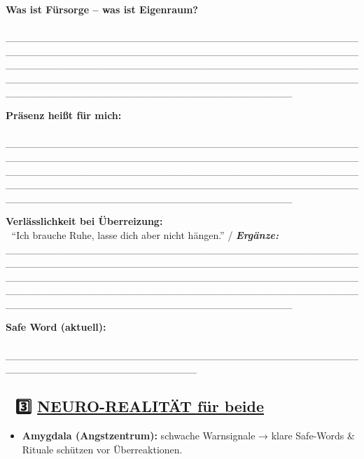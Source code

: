 \textbf{Was ist Fürsorge -- was ist Eigenraum?}\\
📝 \_\_\_\_\_\_\_\_\_\_\_\_\_\_\_\_\_\_\_\_\_\_\_\_\_\_\_\_\_\_\_\_\_\_\_\_\_\_\_\_\_\_\_\_\_\_\_\_\_\_\_\_\_\_\_\_\_\_\_\_\_\_\_\_\_\_\_\_\_\_\_\_\_\_\_\_\_\_\_\_\_\_\_\_\_\_\_\_\_\_\_\_\_\_\_\_\_\_\_\_\_\_\_\_\_\_\_\_\_\_\_\_\_\_\_\_\_\_\_\_\_\_\_\_\_\_\_\_\_\_\_\_\_\_\_\_\_\_\_\_\_\_\_\_\_\_\_\_\_\_\_\_\_\_\_\_\_\_\_\_\_\_\_\_\_\_\_\_\_\_\_\_\_\_\_\_\_\_\_\_\_\_\_\_\_\_\_\_\_\_\_\_\_\_\_\_\_\_\_\_\_\_\_\_\_\_\_\_\_\_\_\_\_\_\_\_\_\_\_\_\_\_\_\_\_\_\_\_\_\_\_

\textbf{Präsenz heißt für mich:}\\
📝 \_\_\_\_\_\_\_\_\_\_\_\_\_\_\_\_\_\_\_\_\_\_\_\_\_\_\_\_\_\_\_\_\_\_\_\_\_\_\_\_\_\_\_\_\_\_\_\_\_\_\_\_\_\_\_\_\_\_\_\_\_\_\_\_\_\_\_\_\_\_\_\_\_\_\_\_\_\_\_\_\_\_\_\_\_\_\_\_\_\_\_\_\_\_\_\_\_\_\_\_\_\_\_\_\_\_\_\_\_\_\_\_\_\_\_\_\_\_\_\_\_\_\_\_\_\_\_\_\_\_\_\_\_\_\_\_\_\_\_\_\_\_\_\_\_\_\_\_\_\_\_\_\_\_\_\_\_\_\_\_\_\_\_\_\_\_\_\_\_\_\_\_\_\_\_\_\_\_\_\_\_\_\_\_\_\_\_\_\_\_\_\_\_\_\_\_\_\_\_\_\_\_\_\_\_\_\_\_\_\_\_\_\_\_\_\_\_\_\_\_\_\_\_\_\_\_\_\_\_\_\_

\textbf{Verlässlichkeit bei Überreizung:}\\
📝 ``Ich brauche Ruhe, lasse dich aber nicht hängen.'' / \emph{\textbf{Ergänze:}} \_\_\_\_\_\_\_\_\_\_\_\_\_\_\_\_\_\_\_\_\_\_\_\_\_\_\_\_\_\_\_\_\_\_\_\_\_\_\_\_\_\_\_\_\_\_\_\_\_\_\_\_\_\_\_\_\_\_\_\_\_\_\_\_\_\_\_\_\_\_\_\_\_\_\_\_\_\_\_\_\_\_\_\_\_\_\_\_\_\_\_\_\_\_\_\_\_\_\_\_\_\_\_\_\_\_\_\_\_\_\_\_\_\_\_\_\_\_\_\_\_\_\_\_\_\_\_\_\_\_\_\_\_\_\_\_\_\_\_\_\_\_\_\_\_\_\_\_\_\_\_\_\_\_\_\_\_\_\_\_\_\_\_\_\_\_\_\_\_\_\_\_\_\_\_\_\_\_\_\_\_\_\_\_\_\_\_\_\_\_\_\_\_\_\_\_\_\_\_\_\_\_\_\_\_\_\_\_\_\_\_\_\_\_\_\_\_\_\_\_\_\_\_\_\_\_\_\_\_\_\_

\textbf{Safe Word (aktuell):}\\
📝 \_\_\_\_\_\_\_\_\_\_\_\_\_\_\_\_\_\_\_\_\_\_\_\_\_\_\_\_\_\_\_\_\_\_\_\_\_\_\_\_\_\_\_\_\_\_\_\_\_\_\_\_\_\_\_\_\_\_\_\_\_\_\_\_\_\_\_\_\_\_\_\_\_\_

\hypertarget{neuro-realituxe4t-fuxfcr-beide}{%
\subsection{\texorpdfstring{🧠 3️⃣ \textbf{\ul{NEURO-REALITÄT für beide}}}{🧠 3️⃣ NEURO-REALITÄT für beide}}\label{neuro-realituxe4t-fuxfcr-beide}}

\begin{itemize}
\tightlist
\item
  \textbf{Amygdala (Angstzentrum):} schwache Warnsignale → klare Safe-Words \& Rituale schützen vor Überreaktionen.
\end{itemize}

